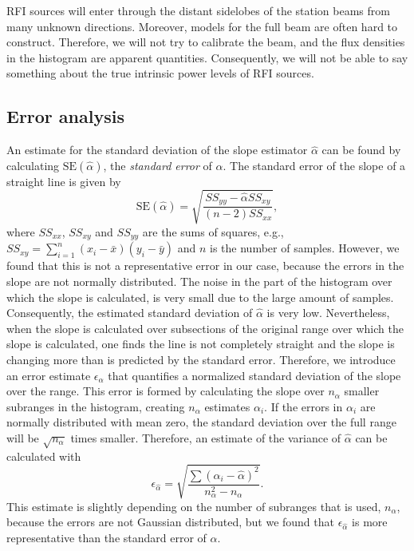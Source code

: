 \documentclass[useAMS,usenatbib]{mn2e}
\begin{document}
RFI sources will enter through the distant sidelobes of the station beams from many unknown directions. Moreover, models for the full beam are often hard to construct. Therefore, we will not try to calibrate the beam, and the flux densities in the histogram are apparent quantities. Consequently, we will not be able to say something about the true intrinsic power levels of RFI sources.

\subsection{Error analysis}
An estimate for the standard deviation of the slope estimator $\hat \alpha$ can be found by calculating $\textrm{SE}(\hat \alpha)$, the \emph{standard error} of $\hat \alpha$. The standard error of the slope of a straight line \citep[pp. 32--35]{acton-analaysis-of-straight-lines} is given by
\begin{equation} \label{eq:stderr-slope}
 \textrm{SE}(\hat \alpha) = \sqrt{\frac{SS_{yy}-\hat\alpha SS_{xy}}{\left(n - 2\right) SS_{xx}}},
\end{equation}
where $SS_{xx}$, $SS_{xy}$ and $SS_{yy}$ are the sums of squares, e.g., $SS_{xy}=\sum_{i=1}^n (x_i - \bar x) (y_i - \bar y)$ and $n$ is the number of samples. However, we found that this is not a representative error in our case, because the errors in the slope are not normally distributed. The noise in the part of the histogram over which the slope is calculated, is very small due to the large amount of samples. Consequently, the estimated standard deviation of $\hat \alpha$ is very low. Nevertheless, when the slope is calculated over subsections of the original range over which the slope is calculated, one finds the line is not completely straight and the slope is changing more than is predicted by the standard error. Therefore, we introduce an error estimate $\epsilon_\alpha$ that quantifies a normalized standard deviation of the slope over the range. This error is formed by calculating the slope over $n_\alpha$ smaller subranges in the histogram, creating $n_\alpha$ estimates $\alpha_i$. If the errors in $\alpha_i$ are normally distributed with mean zero, the standard deviation over the full range will be $\sqrt{n_\alpha}$ times smaller. Therefore, an estimate of the variance of $\hat \alpha$ can be calculated with
\begin{equation}
 \epsilon_{\hat\alpha} = \sqrt{\frac{\sum \left( \alpha_i - \hat\alpha \right)^2 }{n^2_\alpha - n_\alpha}}.
\end{equation}
This estimate is slightly depending on the number of subranges that is used, $n_\alpha$, because the errors are not Gaussian distributed, but we found that $\epsilon_{\hat\alpha}$ is more representative than the standard error of $\hat\alpha$. 
\end{document}
